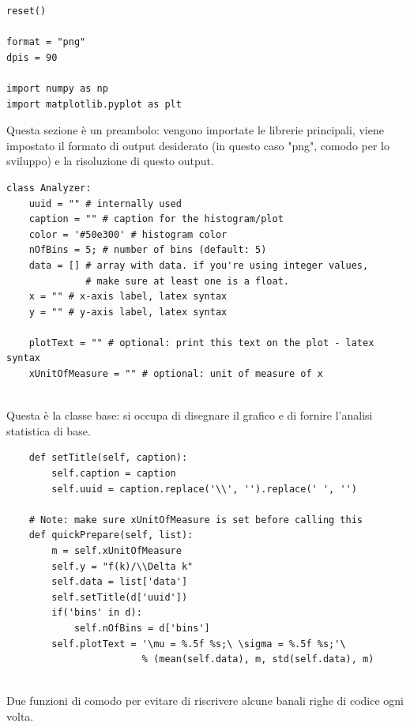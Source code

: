 \begin{lstlisting}
reset()

format = "png"
dpis = 90

import numpy as np
import matplotlib.pyplot as plt
\end{lstlisting}

Questa sezione è un preambolo: vengono importate le librerie principali, viene impostato il formato di output desiderato (in questo caso "png", comodo per lo sviluppo) e la risoluzione di questo output.

\begin{lstlisting}
class Analyzer:
    uuid = "" # internally used
    caption = "" # caption for the histogram/plot
    color = '#50e300' # histogram color
    nOfBins = 5; # number of bins (default: 5)
    data = [] # array with data. if you're using integer values,
    		  # make sure at least one is a float.
    x = "" # x-axis label, latex syntax
    y = "" # y-axis label, latex syntax
    
    plotText = "" # optional: print this text on the plot - latex syntax
    xUnitOfMeasure = "" # optional: unit of measure of x
    
\end{lstlisting}

Questa è la classe base: si occupa di disegnare il grafico e di fornire l'analisi statistica di base.

\begin{lstlisting}
    def setTitle(self, caption):
        self.caption = caption
        self.uuid = caption.replace('\\', '').replace(' ', '')
        
    # Note: make sure xUnitOfMeasure is set before calling this
    def quickPrepare(self, list):
        m = self.xUnitOfMeasure
        self.y = "f(k)/\\Delta k"
        self.data = list['data']
        self.setTitle(d['uuid'])
        if('bins' in d):
            self.nOfBins = d['bins']
        self.plotText = '\mu = %.5f %s;\ \sigma = %.5f %s;'\
                        % (mean(self.data), m, std(self.data), m)
                        
\end{lstlisting}

Due funzioni di comodo per evitare di riscrivere alcune banali righe di codice ogni volta.

